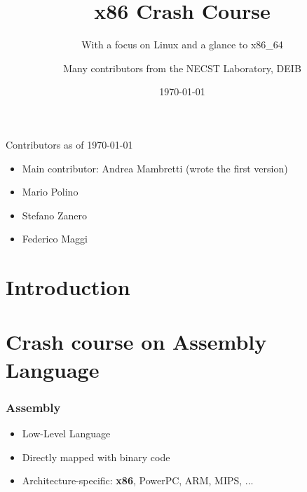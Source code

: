 \documentclass[]{beamer}
\title{x86 Crash Course}
\subtitle{With a focus on Linux and a glance to x86\_64}
\author[NECSTLab]{Many contributors from the NECST Laboratory, DEIB}
\institute{Politecnico di Milano}
\date{\today}
\begin{document}
\begin{frame}
  \titlepage
\end{frame}

\begin{frame}{Contributors as of \today}
  \begin{itemize}
  \item Main contributor: Andrea Mambretti (wrote the first version)
  \item Mario Polino
  \item Stefano Zanero
  \item Federico Maggi
  \end{itemize}
\end{frame}

\section{Introduction}

\begin{frame}
  \tableofcontents
\end{frame}

\section{Crash course on Assembly Language}

\begin{frame}
  \frametitle{Assembly}
  \begin{itemize}
  \item Low-Level Language
  \item Directly mapped with binary code
  \item Architecture-specific: {\bf x86}, PowerPC, ARM, MIPS, ...
  \end{itemize}
\end{frame}
\end{document}
